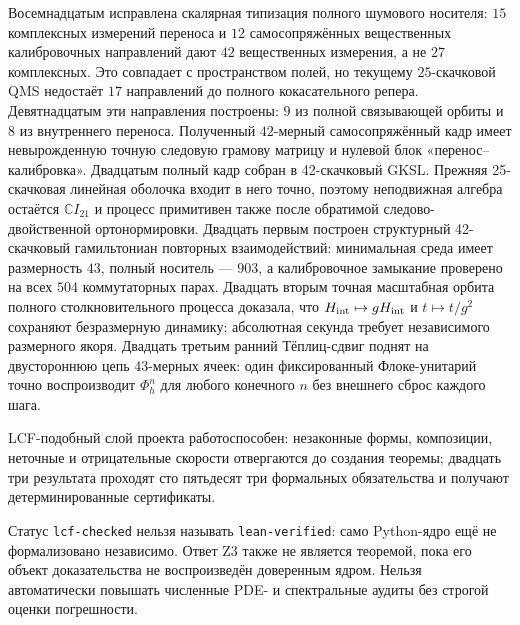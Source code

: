 Восемнадцатым исправлена скалярная типизация полного шумового носителя:
$15$ комплексных измерений переноса и $12$ самосопряжённых вещественных калибровочных направлений дают
$42$ вещественных измерения, а не $27$ комплексных. Это совпадает с пространством полей, но текущему
$25$-скачковой QMS недостаёт $17$ направлений до полного кокасательного репера.
Девятнадцатым эти направления построены: $9$ из полной связывающей орбиты и
$8$ из внутреннего переноса. Полученный $42$-мерный самосопряжённый кадр имеет
невырожденную точную следовую грамову матрицу и нулевой блок «перенос--калибровка».
Двадцатым полный кадр собран в 42-скачковый GKSL. Прежняя 25-скачковая линейная оболочка входит в
него точно, поэтому неподвижная алгебра остаётся $\mathbb CI_{21}$ и процесс
примитивен также после обратимой следово-двойственной ортонормировки.
Двадцать первым построен структурный 42-скачковый гамильтониан повторных взаимодействий:
минимальная среда имеет размерность $43$, полный носитель ---
$903$, а калибровочное замыкание проверено на всех $504$ коммутаторных парах.
Двадцать вторым точная масштабная орбита полного столкновительного процесса доказала,
что $H_{\rm int}\mapsto gH_{\rm int}$ и
$t\mapsto t/g^2$ сохраняют безразмерную динамику; абсолютная секунда требует
независимого размерного якоря.
Двадцать третьим ранний Тёплиц-сдвиг поднят на двустороннюю цепь
43-мерных ячеек: один фиксированный Флоке-унитарий точно воспроизводит
$\Phi_h^n$ для любого конечного $n$ без внешнего сброс каждого шага.

\begin{theorem}
LCF-подобный слой проекта работоспособен: незаконные формы, композиции,
неточные и отрицательные скорости отвергаются до создания теоремы; двадцать три
результата проходят сто пятьдесят три формальных обязательства и получают
детерминированные сертификаты.
\end{theorem}

\begin{nogocriterion}
Статус \texttt{lcf-checked} нельзя называть \texttt{lean-verified}: само
Python-ядро ещё не формализовано независимо. Ответ Z3 также не является
теоремой, пока его объект доказательства не воспроизведён доверенным ядром. Нельзя
автоматически повышать численные PDE- и спектральные аудиты без строгой
оценки погрешности.
\end{nogocriterion}

